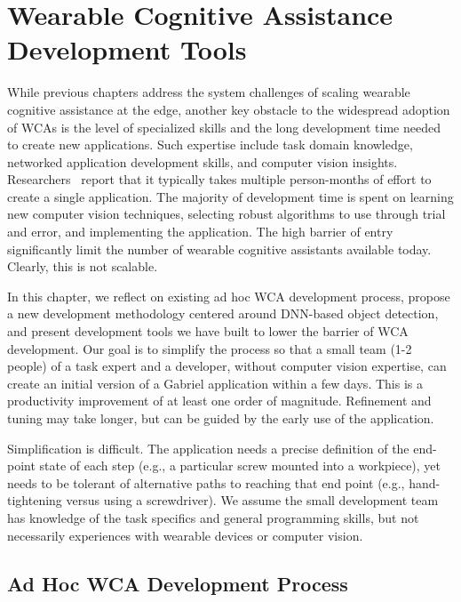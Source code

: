 \chapter{Wearable Cognitive Assistance Development Tools}
\label{chapter: app-dev}

While previous chapters address the system challenges of scaling wearable
cognitive assistance at the edge, another key obstacle to the widespread
adoption of WCAs is the level of specialized skills and the long development
time needed to create new applications. Such expertise include task domain
knowledge, networked application development skills, and computer vision
insights. Researchers~\cite{chen2018application} report that it typically takes
multiple person-months of effort to create a single application. The majority of
development time is spent on learning new computer vision techniques, selecting
robust algorithms to use through trial and error, and implementing the
application. The high barrier of entry significantly limit the number of
wearable cognitive assistants available today. Clearly, this is not scalable. 

In this chapter, we reflect on existing ad hoc WCA development process, propose
a new development methodology centered around DNN-based object detection, and
present development tools we have built to lower the barrier of WCA development.
Our goal is to simplify the process so that a small team (1-2 people) of a task
expert and a developer, without computer vision expertise, can create an initial
version of a Gabriel application within a few days. This is a productivity
improvement of at least one order of magnitude. Refinement and tuning may take
longer, but can be guided by the early use of the application. 

Simplification is difficult. The application needs a precise definition of the
end-point state of each step (e.g., a particular screw mounted into a
workpiece), yet needs to be tolerant of alternative paths to reaching that end
point (e.g., hand-tightening versus using a screwdriver). We assume the small
development team has knowledge of the task specifics and general programming
skills, but not necessarily experiences with wearable devices or computer
vision.

\section{Ad Hoc WCA Development Process}
\label{sec: app-dev-adhoc}

